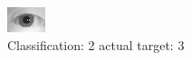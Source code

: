 \begin{figure}[h!]
\begin{center}
\includegraphics[width=0.60\columnwidth]{figures/ID1094_class_2_target_3.png}
\end{center}
\caption{ Classification: 2 actual target: 3}
\label{fig:ID1094_class_2_target_3}
\end{figure}
